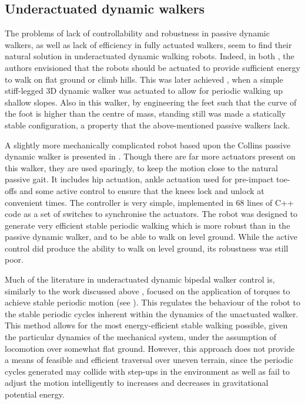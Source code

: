 \subsection{Underactuated dynamic walkers}
The problems of lack of controllability and robustness in passive dynamic walkers, as well as lack of efficiency in fully actuated walkers, seem to find their natural solution in underactuated dynamic walking robots. Indeed, in both \cite{mcgeer1990passive, collins2001three}, the authors envisioned that the robots should be actuated to provide sufficient energy to walk on flat ground or climb hills. This was later  achieved \cite{tedrake2004actuating}, when a simple stiff-legged 3D dynamic walker was actuated to allow for periodic walking up shallow slopes. Also in this walker, by engineering the feet such that the curve of the foot is higher than the centre of mass, standing still was made a statically stable configuration, a property that the above-mentioned passive walkers lack.

A slightly more mechanically complicated robot based upon the Collins passive dynamic walker is presented in \cite{collins2005bipedal}. Though there are far more actuators present on this walker, they are used sparingly, to keep the motion close to the natural passive gait. It includes hip actuation, ankle actuation used for pre-impact toe-offs and some active control to ensure that the knees lock and unlock at convenient times. The controller is very simple, implemented in 68 lines of C++ code as a set of switches to synchronise the actuators. The robot was designed to generate very efficient stable periodic walking which is more robust than in the passive dynamic walker, and to be able to walk on level ground. While the active control did produce the ability to walk on level ground, its robustness was still poor.

Much of the literature in underactuated dynamic bipedal walker control is, similarly to the work discussed above \cite{tedrake2004actuating, collins2005bipedal}, focused on the application of torques to achieve stable periodic motion (see \cite{grizzle2001asymptotically, shiriaev2005constructive, sreenath2011compliant}). This regulates the behaviour of the robot to the stable periodic cycles inherent within the dynamics of the unactuated walker. This method allows for the most energy-efficient stable walking possible, given the particular dynamics of the mechanical system, under the assumption of locomotion over somewhat flat ground. However, this approach does not provide a means of feasible and efficient traversal over uneven terrain, since the periodic cycles generated may collide with step-ups in the environment as well as fail to adjust the motion intelligently to increases and decreases in gravitational potential energy.

